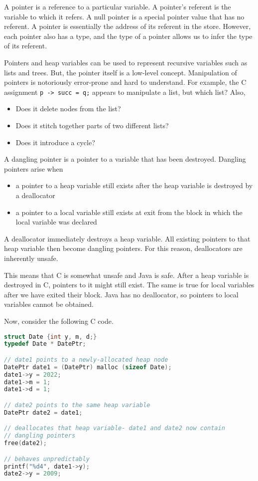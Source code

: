\documentclass[a4paper, openany]{memoir}
\begin{document}
A pointer is a reference to a particular variable. A pointer's referent is the variable to which it refers. A null pointer is a special pointer value that has no referent. A pointer is essentially the address of its referent in the store. However, each pointer also has a type, and the type of a pointer allows us to infer the type of its referent.

Pointers and heap variables can be used to represent recursive variables such as lists and trees. But, the pointer itself is a low-level concept. Manipulation of pointers is notoriously error-prone and hard to understand. For example, the C assignment \texttt{p -> succ = q;} appears to manipulate a list, but which list? Also,
\begin{itemize}
    \item Does it delete nodes from the list?
    \item Does it stitch together parts of two different lists?
    \item Does it introduce a cycle?
\end{itemize}

A dangling pointer is a pointer to a variable that has been destroyed. Dangling pointers arise when
\begin{itemize}
    \item a pointer to a heap variable still exists after the heap variable is destroyed by a deallocator
    \item a pointer to a local variable still exists at exit from the block in which the local variable was declared
\end{itemize}
A deallocator immediately destroys a heap variable. All existing pointers to that heap variable then become dangling pointers. For this reason, deallocators are inherently unsafe.

This means that C is somewhat unsafe and Java is safe. After a heap variable is destroyed in C, pointers to it might still exist. The same is true for local variables after we have exited their block. Java has no deallocator, so pointers to local variables cannot be obtained.

Now, consider the following C code.
\begin{lstlisting}[language=C]
struct Date {int y, m, d;}
typedef Date * DatePtr;

// date1 points to a newly-allocated heap node
DatePtr date1 = (DatePtr) malloc (sizeof Date);
date1->y = 2022;
date1->m = 1;
date1->d = 1;

// date2 points to the same heap variable
DatePtr date2 = date1;

// deallocates that heap variable- date1 and date2 now contain 
// dangling pointers
free(date2);

// behaves unpredictably
printf("%d4", date1->y);
date2->y = 2009;
\end{lstlisting}
\end{document}
